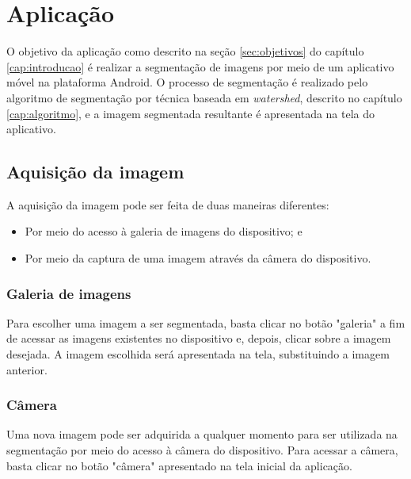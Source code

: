 \chapter{Aplicação}\label{cap:aplicacao}

O objetivo da aplicação como descrito na seção \ref{sec:objetivos} do capítulo \ref{cap:introducao} é realizar a segmentação de imagens por meio de um aplicativo móvel na plataforma Android.
O processo de segmentação é realizado pelo algoritmo de segmentação por técnica baseada em \textit{watershed}, descrito no capítulo \ref{cap:algoritmo}, e a imagem segmentada resultante é apresentada na tela do aplicativo.

\section{Aquisição da imagem}\label{sec:aquisicao_aplicacao}

A aquisição da imagem pode ser feita de duas maneiras diferentes: 

\begin{itemize}
    \item Por meio do acesso à galeria de imagens do dispositivo; e
    \item Por meio da captura de uma imagem através da câmera do dispositivo.
\end{itemize}

\subsection{Galeria de imagens}

Para escolher uma imagem a ser segmentada, basta clicar no botão "galeria" a fim de acessar as imagens existentes no dispositivo e, depois, clicar sobre a imagem desejada.
A imagem escolhida será apresentada na tela, substituindo a imagem anterior.

\subsection{Câmera}

Uma nova imagem pode ser adquirida a qualquer momento para ser utilizada na segmentação por meio do acesso à câmera do dispositivo. Para acessar a câmera, basta clicar no botão "câmera" apresentado na tela inicial da aplicação.

